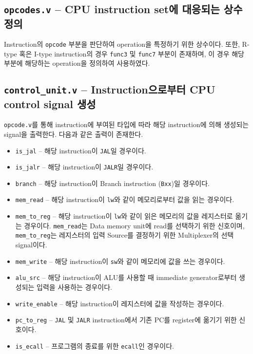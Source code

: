 \documentclass{scrartcl}
\begin{document}
\subsection{\texttt{opcodes.v} -- CPU instruction set에 대응되는 상수 정의}
Instruction의 \texttt{opcode} 부분을 판단하여 operation을 특정하기 위한 상수이다.
또한, R-type 혹은 I-type instruction의 경우 \texttt{func3} 및 \texttt{func7} 부분이 존재하며,
이 경우 해당 부분에 해당하는 operation을 정의하여 사용하였다.

\subsection{\texttt{control\_unit.v} -- Instruction으로부터 CPU control signal 생성}
\texttt{opcode.v}를 통해 instruction에 부여된 타입에 따라 해당 instruction에 의해 생성되는 signal을 출력한다.
다음과 같은 출력이 존재한다.
\begin{itemize}
    \item \texttt{is\_jal} -- 해당 instruction이 \texttt{JAL}일 경우이다.
    \item \texttt{is\_jalr} -- 해당 instruction이 \texttt{JALR}일 경우이다.
    \item \texttt{branch} -- 해당 instruction이 Branch instruction (\texttt{Bxx})일 경우이다.
    \item \texttt{mem\_read} -- 해당 instruction이 \texttt{lw}와 같이 메모리로부터 값을 읽는 경우이다.
    \item \texttt{mem\_to\_reg} -- 해당 instruction이 \texttt{lw}와 같이 읽은 메모리의 값을 레지스터로 옮기는 경우이다.
        \subitem \texttt{mem\_read}는 Data memory unit에 read를 선택하기 위한 신호이며, \texttt{mem\_to\_reg}는 레지스터의 입력 Source를 결정하기 위한 Multiplexer의 선택 signal이다.
    \item \texttt{mem\_write} -- 해당 instruction이 \texttt{sw}와 같이 메모리에 값을 쓰는 경우이다.
    \item \texttt{alu\_src} -- 해당 instruction이 ALU를 사용할 때 immediate generator로부터 생성되는 입력을 사용하는 경우이다.
    \item \texttt{write\_enable} -- 해당 instruction이 레지스터에 값을 작성하는 경우이다.
    \item \texttt{pc\_to\_reg} -- \texttt{JAL} 및 \texttt{JALR} instruction에서 기존 PC를 register에 옮기기 위한 신호이다.
    \item \texttt{is\_ecall} -- 프로그램의 종료를 위한 \texttt{ecall}인 경우이다.
\end{itemize}
\end{document}
